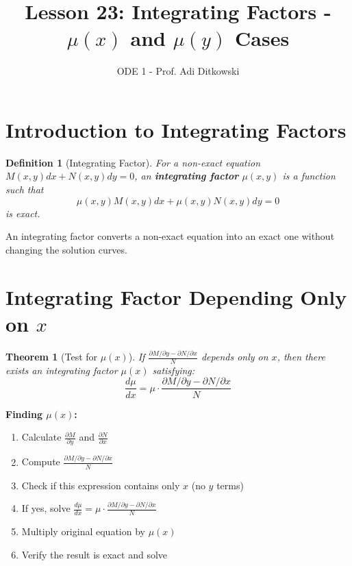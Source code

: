 \documentclass[12pt]{article}
\title{Lesson 23: Integrating Factors - $\mu(x)$ and $\mu(y)$ Cases}
\author{ODE 1 - Prof. Adi Ditkowski}
\date{}
\newtheorem{definition}{Definition}
\newtheorem{theorem}{Theorem}
\begin{document}
\maketitle

\section{Introduction to Integrating Factors}

\begin{definition}[Integrating Factor]
For a non-exact equation $M(x,y)dx + N(x,y)dy = 0$, an \textbf{integrating factor} $\mu(x,y)$ is a function such that
$$\mu(x,y)M(x,y)dx + \mu(x,y)N(x,y)dy = 0$$
is exact.
\end{definition}

\begin{keypoint}
An integrating factor converts a non-exact equation into an exact one without changing the solution curves.
\end{keypoint}

\section{Integrating Factor Depending Only on $x$}

\begin{theorem}[Test for $\mu(x)$]
If $\frac{\partial M/\partial y - \partial N/\partial x}{N}$ depends only on $x$, then there exists an integrating factor $\mu(x)$ satisfying:
$$\frac{d\mu}{dx} = \mu \cdot \frac{\partial M/\partial y - \partial N/\partial x}{N}$$
\end{theorem}

\begin{algorithm}
\textbf{Finding $\mu(x)$:}
\begin{enumerate}
    \item Calculate $\frac{\partial M}{\partial y}$ and $\frac{\partial N}{\partial x}$
    \item Compute $\frac{\partial M/\partial y - \partial N/\partial x}{N}$
    \item Check if this expression contains only $x$ (no $y$ terms)
    \item If yes, solve $\frac{d\mu}{dx} = \mu \cdot \frac{\partial M/\partial y - \partial N/\partial x}{N}$
    \item Multiply original equation by $\mu(x)$
    \item Verify the result is exact and solve
\end{enumerate}
\end{algorithm}
\end{document}
